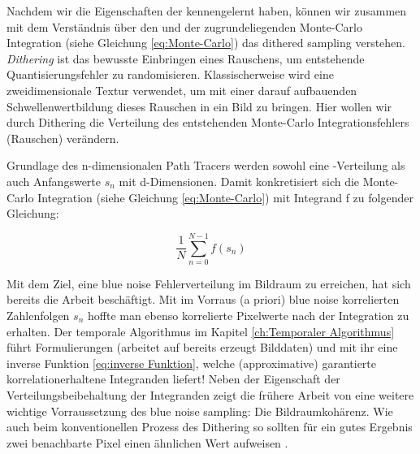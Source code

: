 \label{subsec:dither sampling}
Nachdem wir die Eigenschaften der  kennengelernt haben,
können wir zusammen mit dem Verständnis über den  und der 
zugrundeliegenden Monte-Carlo Integration (siehe Gleichung \ref{eq:Monte-Carlo}) das \glqq dithered sampling\grqq{} verstehen.
\textit{Dithering} ist das bewusste Einbringen eines Rauschens, um entstehende Quantisierungsfehler zu randomisieren.
Klassischerweise wird eine zweidimensionale  Textur verwendet, um mit einer darauf aufbauenden Schwellenwertbildung
dieses Rauschen in ein Bild zu bringen. Hier wollen wir durch Dithering die Verteilung des entstehenden Monte-Carlo Integrationsfehlers (Rauschen) verändern.\par
Grundlage des n-dimensionalen Path Tracers werden sowohl eine -Verteilung als auch Anfangswerte $s_{n}$ mit d-Dimensionen.
Damit konkretisiert sich die Monte-Carlo Integration (siehe Gleichung \ref{eq:Monte-Carlo}) mit Integrand f zu folgender Gleichung:

\begin{tcolorbox}[rightrule=3mm, rounded corners=east]
    \begin{equation}\label{eq:concreteMonteCarlo}
        \frac{1}{N}\sum_{n=0}^{N-1}f(s_{n})
    \end{equation}
\end{tcolorbox}


Mit dem Ziel, eine blue noise Fehlerverteilung im Bildraum zu erreichen, hat sich bereits die Arbeit \cite{georgiev2016blue} beschäftigt. 
Mit im Vorraus (\glqq a priori\grqq{}) blue noise korrelierten Zahlenfolgen $s_{n}$ hoffte man ebenso korrelierte Pixelwerte nach 
der Integration zu erhalten. Der temporale Algorithmus im Kapitel \ref{ch:Temporaler Algorithmus} führt 
Formulierungen (arbeitet auf bereits erzeugt Bilddaten) und mit ihr eine inverse Funktion \ref{eq:inverse Funktion}, welche (approximative) garantierte
korrelationerhaltene Integranden liefert! Neben der Eigenschaft der Verteilungsbeibehaltung der Integranden zeigt die frühere Arbeit von \cite[Seite 3]{hal02158423}
eine weitere wichtige Vorraussetzung des blue noise sampling: Die Bildraumkohärenz. Wie auch beim konventionellen Prozess des Dithering so sollten für ein gutes
Ergebnis zwei benachbarte Pixel einen ähnlichen Wert aufweisen \cite{3288}.




